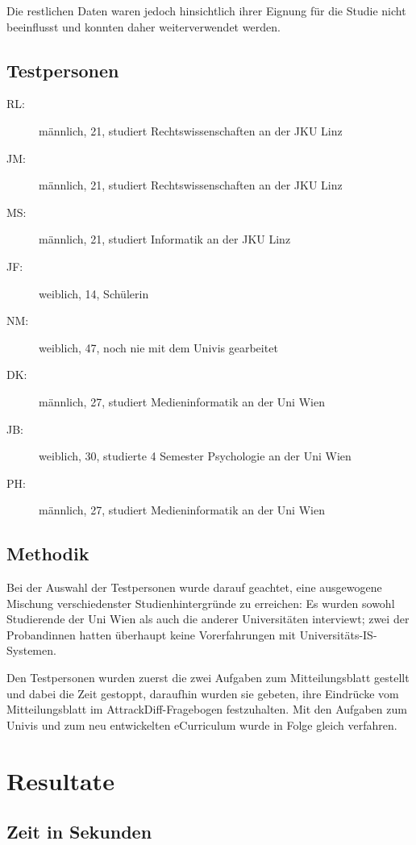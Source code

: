 \documentclass[a4paper,10pt]{scrartcl}
\begin{document}
Die restlichen Daten waren jedoch hinsichtlich ihrer Eignung für die Studie nicht beeinflusst und konnten daher weiterverwendet werden.

\subsection{Testpersonen}

\begin{description}
 \item[RL:] männlich, 21, studiert Rechtswissenschaften an der JKU Linz
 \item[JM:] männlich, 21, studiert Rechtswissenschaften an der JKU Linz
 \item[MS:] männlich, 21, studiert Informatik an der JKU Linz
 \item[JF:] weiblich, 14, Schülerin
 \item[NM:] weiblich, 47, noch nie mit dem Univis gearbeitet
 \item[DK:] männlich, 27, studiert Medieninformatik an der Uni Wien
 \item[JB:] weiblich, 30, studierte 4 Semester Psychologie an der Uni Wien
 \item[PH:] männlich, 27, studiert Medieninformatik an der Uni Wien
\end{description}

\subsection{Methodik}

Bei der Auswahl der Testpersonen wurde darauf geachtet, eine ausgewogene Mischung verschiedenster Studienhintergründe zu erreichen: Es wurden sowohl Studierende der Uni Wien als auch die anderer Universitäten interviewt; zwei der Probandinnen hatten überhaupt keine Vorerfahrungen mit Universitäts-IS-Systemen.

Den Testpersonen wurden zuerst die zwei Aufgaben zum Mitteilungsblatt gestellt und dabei die Zeit gestoppt, daraufhin wurden sie gebeten, ihre Eindrücke vom Mitteilungsblatt im AttrackDiff-Fragebogen festzuhalten. Mit den Aufgaben zum Univis und zum neu entwickelten eCurriculum wurde in Folge gleich verfahren.

\section{Resultate} 


\subsection*{Zeit in Sekunden} 
\end{document}
